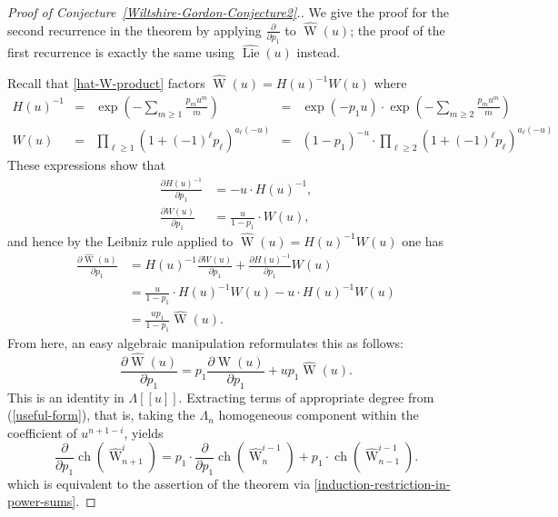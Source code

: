 \documentclass[12pt]{amsart}
\theoremstyle{plain}
\theoremstyle{definition}
\begin{document}
\begin{proof}[Proof of Conjecture~\ref{Wiltshire-Gordon-Conjecture2}.]
We give the proof for the second recurrence in the theorem
by applying $\frac{\partial}{\partial p_1}$ to $\widehat{{\operatorname{W}}}(u)$;
the proof of the first recurrence is exactly the same using
$\widehat{{\operatorname{Lie}}}(u)$ instead.

Recall that \eqref{hat-W-product} factors
$\widehat{{\operatorname{W}}}(u)= H(u)^{-1} W(u)$
where 
$$
\begin{array}{rclcl}
H(u)^{-1} &=&  \exp\left( - \sum_{m \geq 1} \frac{p_m u^m}{m} \right) 
          &=&\exp(-p_1 u) \cdot \exp\left( - \sum_{m \geq 2} \frac{p_m u^m}{m} \right)\\
W(u) &=& \prod_{\ell \geq 1} 
   \left( 
     1 + (-1)^\ell p_\ell 
   \right)^{a_\ell(-u)}
&=& (1-p_1)^{-u} \cdot
   \prod_{\ell \geq 2} 
   \left( 
     1 + (-1)^\ell p_\ell 
   \right)^{a_{\ell}(-u)}
\end{array}
$$
These expressions show that
$$
\begin{aligned}
\frac{\partial  H(u)^{-1}}{\partial p_1} 
  &= -u\cdot H(u)^{-1},\\
\frac{\partial W(u)}{\partial p_1} 
 &= \frac{u}{1-p_1} \cdot W(u),
\end{aligned}
$$
and hence by the Leibniz rule applied to $\widehat{{\operatorname{W}}}(u)= H(u)^{-1} W(u)$ one has
$$
\begin{aligned}
\frac{\partial \widehat{{\operatorname{W}}}(u)}{\partial p_1}  
 &= H(u)^{-1} \frac{\partial W(u) }{\partial p_1}  
      + \frac{\partial  H(u)^{-1}}{\partial p_1} W(u) \\
 &=  \frac{u}{1-p_1}\cdot H(u)^{-1}W(u) -u\cdot H(u)^{-1}W(u) \\
 &= \frac{up_1}{1-p_1}\widehat{{\operatorname{W}}}(u).
\end{aligned}
$$
From here, an easy algebraic manipulation reformulates this as follows:
\begin{equation}
\label{useful-form}
\frac{\partial \widehat{{\operatorname{W}}}(u)}{\partial p_1}  
= p_1 \frac{\partial \widehat{{\operatorname{W}}}(u)}{\partial p_1} + up_1 \widehat{{\operatorname{W}}}(u).
\end{equation}
This is an identity in $\Lambda[[u]]$.  Extracting terms of appropriate degree from (\ref{useful-form}),  
that is, taking the 
$\Lambda_n$ homogeneous component within the coefficient of
$u^{n+1-i}$, yields
\begin{equation}
\label{PDE-version-of-W-G-Conj-2}
\frac{\partial}{\partial p_1} {{\operatorname{ch}}}(\widehat{{\operatorname{W}}}^i_{n+1}) 
= p_1 \cdot \frac{\partial}{\partial p_1} {{\operatorname{ch}}}(\widehat{{\operatorname{W}}}^{i-1}_{n})
+ p_1 \cdot {{\operatorname{ch}}}(\widehat{{\operatorname{W}}}^{i-1}_{n-1}).
\end{equation}
which is equivalent to the assertion of the theorem via
\eqref{induction-restriction-in-power-sums}.
\end{proof}
\end{document}

